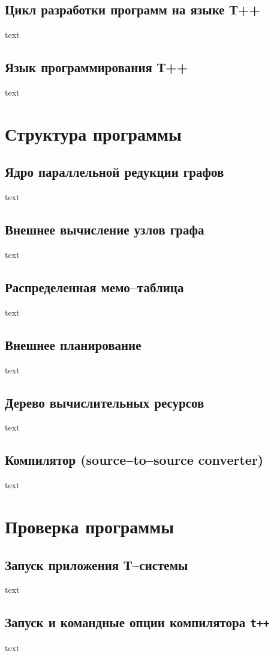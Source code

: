 \subsection{Цикл разработки программ на языке Т++}
text

\subsection{Язык программирования Т++}
text


\section{Структура программы}

\subsection{Ядро параллельной редукции графов}
text

\subsection{Внешнее вычисление узлов графа}
text

\subsection{Распределенная мемо--таблица}
text

\subsection{Внешнее планирование}
text

\subsection{Дерево вычислительных ресурсов}
text

\subsection{Компилятор (source--to--source converter)}
text


\section{Проверка программы}

\subsection{Запуск приложения Т--системы}

text 

\subsection{Запуск и командные опции компилятора {\tt t++}}

text

\endinput
